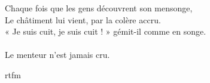 \documentclass[a4paper,12pt,bibliography=totoc,index=totoc,twoside,francais]{scrbook}
\begin{document}


\frontmatter
\begin{flushright}
Chaque fois que les gens découvrent son mensonge,\\
Le châtiment lui vient, par la colère accru.\\
« Je suis cuit, je suis cuit ! » gémit-il comme en songe.\\
~\\
Le menteur n'est jamais cru.\\
\end{flushright}

\tableofcontents
\listoftables
\listoffigures

\mainmatter








\appendix

%
\gls{rtfm}

\backmatter
\nocite{*}
\printbibliography
\printindex

\printglossaries

\cleardoublepage

\end{document}
